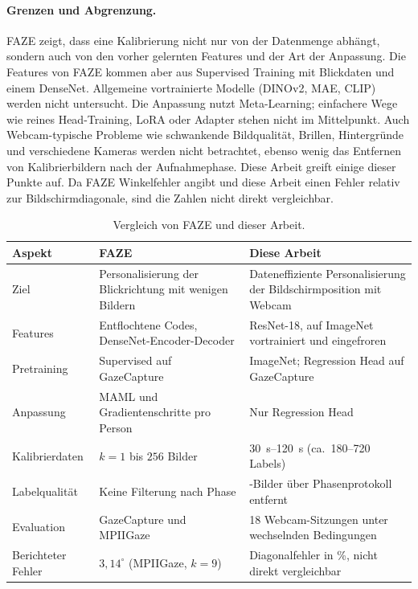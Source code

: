 \paragraph{Grenzen und Abgrenzung.}
FAZE zeigt, dass eine Kalibrierung nicht nur von der Datenmenge abhängt,
sondern auch von den vorher gelernten Features und der Art der Anpassung. Die
Features von FAZE kommen aber aus Supervised Training mit Blickdaten und einem
DenseNet. Allgemeine vortrainierte Modelle (DINOv2, MAE, CLIP) werden nicht
untersucht. Die Anpassung nutzt Meta-Learning; einfachere Wege wie reines
Head-Training, LoRA oder Adapter stehen nicht im Mittelpunkt. Auch
Webcam-typische Probleme wie schwankende Bildqualität, Brillen, Hintergründe
und verschiedene Kameras werden nicht betrachtet, ebenso wenig das Entfernen von
Kalibrierbildern nach der Aufnahmephase. Diese Arbeit greift einige dieser
Punkte auf. Da FAZE Winkelfehler angibt und diese Arbeit einen Fehler relativ
zur Bildschirmdiagonale, sind die Zahlen nicht direkt vergleichbar.

\begin{table}[htbp]
  \centering
  \small
  \caption{Vergleich von FAZE und dieser Arbeit.}
  \label{tab:faze_vergleich}
  \begin{tabularx}{\textwidth}{L{3.0cm} Y Y}
    \toprule
    \textbf{Aspekt} & \textbf{FAZE~\cite{park2019faze}} & \textbf{Diese Arbeit} \\
    \midrule
    Ziel & Personalisierung der Blickrichtung mit wenigen Bildern & Dateneffiziente Personalisierung der Bildschirmposition mit Webcam \\
    Features & Entflochtene Codes, DenseNet-Encoder-Decoder & ResNet-18, auf ImageNet vortrainiert und eingefroren \\
    Pretraining & Supervised auf GazeCapture & ImageNet; Regression Head auf GazeCapture \\
    Anpassung & MAML und Gradientenschritte pro Person & Nur Regression Head \\
    Kalibrierdaten & $k = 1$ bis $256$ Bilder & \SIrange{30}{120}{\second} (ca.\ 180--720 Labels) \\
    Labelqualität & Keine Filterung nach Phase & -Bilder über Phasenprotokoll entfernt \\
    Evaluation & GazeCapture und MPIIGaze & 18 Webcam-Sitzungen unter wechselnden Bedingungen \\
    Berichteter Fehler & $3,14^\circ$ (MPIIGaze, $k = 9$) & Diagonalfehler in \%, nicht direkt vergleichbar \\
    \bottomrule
  \end{tabularx}
\end{table}

